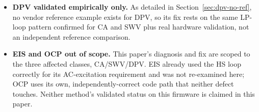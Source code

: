 \begin{itemize}
\item \textbf{DPV validated empirically only.} As detailed in
  Section~\ref{sec:dpv-no-ref}, no vendor reference example exists for
  DPV, so its fix rests on the same LP-loop pattern confirmed for CA and
  SWV plus real hardware validation, not an independent reference
  comparison.
\item \textbf{EIS and OCP out of scope.} This paper's diagnosis and fix
  are scoped to the three affected classes, CA/SWV/DPV. EIS already used
  the HS loop correctly for its AC-excitation requirement and was not
  re-examined here; OCP uses its own, independently-correct code path
  that neither defect touches. Neither method's validated status on this
  firmware is claimed in this paper.
\end{itemize}
